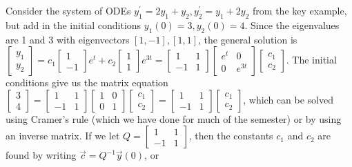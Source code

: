 \begin{example}
Consider the system of ODEs $y_1^\prime = 2y_1+y_2, y_2^\prime= y_1+2y_2$ from the key example, but add in the initial conditions $y_1(0)=3,y_2(0)=4$. Since the eigenvalues are 1 and 3 with eigenvectors $[1,-1],[1,1]$, the general solution is 
$
\begin{bmatrix}y_1\\y_2\end{bmatrix} 
= c_1\begin{bmatrix}1\\-1\end{bmatrix}e^t 
+ c_2\begin{bmatrix}1\\1\end{bmatrix}e^{3t}
=
\begin{bmatrix}1 &1\\-1&1\end{bmatrix}
\begin{bmatrix}e^t&0\\0&e^{3t}\end{bmatrix}
\begin{bmatrix}c_1\\c_2\end{bmatrix} 
$. 
The initial conditions give us the matrix equation 
$
\begin{bmatrix}3\\4\end{bmatrix} 
= 
\begin{bmatrix}1 &1\\-1&1\end{bmatrix}
\begin{bmatrix}1&0\\0&1\end{bmatrix}
\begin{bmatrix}c_1\\c_2\end{bmatrix} 
=
\begin{bmatrix}1 &1\\-1&1\end{bmatrix}
\begin{bmatrix}c_1\\c_2\end{bmatrix} 
$, which can be solved using Cramer's rule (which we have done for much of the semester) or by using an inverse matrix.  If we let $Q = \begin{bmatrix}1 &1\\-1&1\end{bmatrix}$, then the constants $c_1$ and $c_2$ are found by writing $\vec c = Q^{-1} \vec y(0)$, or 

\end{example}

